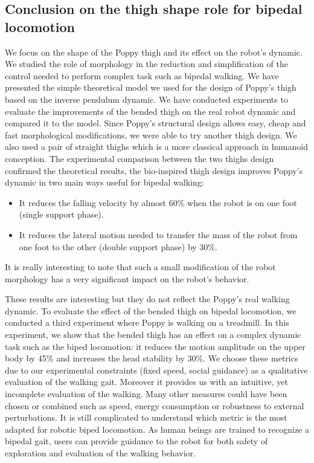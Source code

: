 \subsection{Conclusion on the thigh shape role for bipedal locomotion} %
We focus on the shape of the Poppy thigh and its effect on the robot’s dynamic. We studied the role of morphology in the reduction and simplification of the control needed to perform complex task such as bipedal walking. We have presented the simple theoretical model we used for the design of Poppy’s thigh based on the inverse pendulum dynamic. We have conducted experiments to evaluate the improvements of the bended thigh on the real robot dynamic and compared it to the model. Since Poppy’s structural design allows easy, cheap and fast morphological modifications, we were able to try another thigh design. We also used a pair of straight thighs which is a more classical approach in humanoid conception. The experimental comparison between the two thighs design confirmed the theoretical results, the bio-inspired thigh design improves Poppy’s dynamic in two main ways useful for bipedal walking:
\begin{itemize}
    \item It reduces the falling velocity by almost 60\% when the robot is on one foot (single support phase).
    \item It reduces the lateral motion needed to transfer the mass of the robot from one foot to the other (double support phase) by 30\%.
\end{itemize}
It is really interesting to note that such a small modification of the robot morphology has a very significant impact on the robot’s behavior.

These results are interesting but they do not reflect the Poppy’s real walking dynamic. To evaluate the effect of the bended thigh on bipedal locomotion, we conducted a third experiment where Poppy is walking on a treadmill. In this experiment, we show that the bended thigh has an effect on a complex dynamic task such as the biped locomotion: it reduces the motion amplitude on the upper body  by 45\% and increases the head stability by 30\%. We choose these metrics due to our experimental constraints (fixed speed, social guidance) as a qualitative evaluation of the walking gait. Moreover it provides us with an intuitive, yet incomplete evaluation of the walking. Many other measures could have been chosen or combined such as speed, energy consumption or robustness to external perturbations. It is still complicated to understand which metric is the most adapted for robotic biped locomotion. As human beings are trained to recognize a bipedal gait, users can provide guidance to the robot for both safety of exploration and evaluation of the walking behavior.



